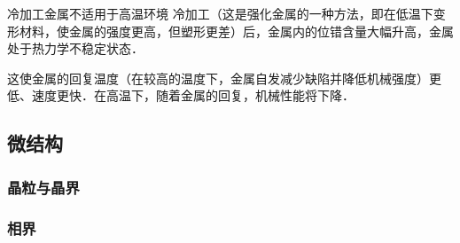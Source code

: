 \begin{example}{冷加工金属不适用于高温环境}
冷加工（这是强化金属的一种方法，即在低温下变形材料，使金属的强度更高，但塑形更差）后，金属内的位错含量大幅升高，金属处于热力学不稳定状态．

这使金属的回复温度（在较高的温度下，金属自发减少缺陷并降低机械强度）更低、速度更快．在高温下，随着金属的回复，机械性能将下降．
\end{example}

\subsection{微结构}
\subsubsection{晶粒与晶界}
\subsubsection{相界}
